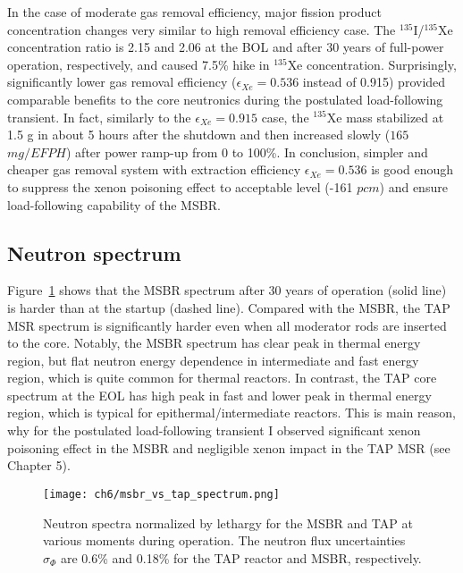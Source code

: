 In the case of moderate gas removal efficiency, major fission product 
concentration changes very similar to high removal efficiency case. The 
$^{135}$I/$^{135}$Xe concentration ratio is 2.15 and 2.06 at the \gls{BOL} and 
after 30 years of full-power operation, respectively, and caused 7.5\% hike 
in $^{135}$Xe concentration. Surprisingly, significantly lower gas removal 
efficiency ($\epsilon_{Xe}=0.536$ instead of 0.915) provided comparable 
benefits to the core neutronics during the postulated load-following 
transient. In fact, similarly to the $\epsilon_{Xe}=0.915$ case, the 
$^{135}$Xe mass stabilized at 1.5 g in about 5 hours after the shutdown and 
then increased slowly ($165$ $mg/EFPH$) after power ramp-up from 0 to 100\%.
In conclusion, simpler and cheaper gas removal system with extraction 
efficiency $\epsilon_{Xe}=0.536$ is good enough to suppress the xenon 
poisoning effect to acceptable level (-161 $pcm$) and ensure load-following 
capability of the \gls{MSBR}.


\subsection{Neutron spectrum}
Figure~\ref{fig:ch6-msbr-spectrum} shows that the \gls{MSBR} spectrum after 30 
years of operation (solid line) is harder than at the startup (dashed line). 
Compared with the \gls{MSBR}, the \gls{TAP} \gls{MSR} spectrum is 
significantly 
harder even when all moderator rods are inserted to the core. Notably, the 
\gls{MSBR} spectrum has clear peak in thermal energy region, but flat neutron 
energy dependence in intermediate and fast energy region, which is quite 
common for thermal reactors. In contrast, the \gls{TAP} core spectrum at the 
\gls{EOL} has high peak in fast and lower peak in thermal energy region, 
which is typical for epithermal/intermediate reactors. This is main reason, 
why for the postulated load-following transient I observed significant xenon 
poisoning effect in the \gls{MSBR} and negligible xenon impact in the 
\gls{TAP} \gls{MSR} (see Chapter 5).
\begin{figure}[htbp!] %
	\centering
	\texttt{[image: ch6/msbr\_vs\_tap\_spectrum.png]}
	\caption{Neutron spectra normalized by lethargy for the \gls{MSBR} and 
		\gls{TAP} at various moments during operation. The neutron flux 
		uncertainties $\sigma_{\Phi}$ are 0.6\% and 0.18\% for the \gls{TAP} 
		reactor and \gls{MSBR}, respectively.}
	\label{fig:ch6-msbr-spectrum}
\end{figure}

